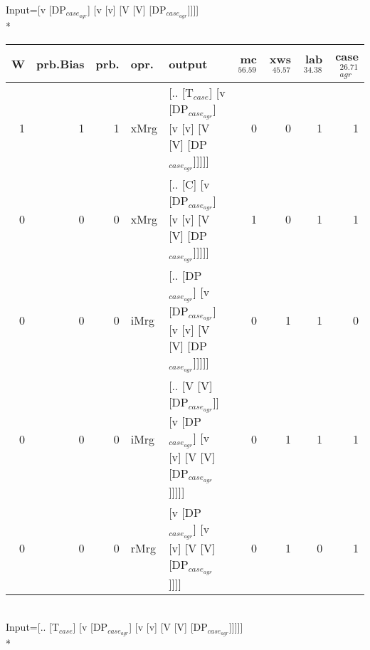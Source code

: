 \begingroup\scriptsize Input=[v [DP$_{case_{agr}}$] [v [v] [V [V] [DP$_{case_{agr}}$]]]]\\*
\begin{tabularx}{\linewidth}{rrrlXrrrr}
\hline
   W &   prb.Bias &   prb. & opr.   & output                                                                     &   mc$^{56.59}$ &   xws$^{45.57}$ &   lab$^{34.38}$ &   case$_{agr}^{26.71}$ \\
\hline
   1 &       1 &   1 & xMrg & [.. [T$_{case}$] [v [DP$_{case_{agr}}$] [v [v] [V [V] [DP$_{case_{agr}}$]]]]]              &            0 &             0 &             1 &                  1 \\
   0 &       0 &   0 & xMrg & [.. [C] [v [DP$_{case_{agr}}$] [v [v] [V [V] [DP$_{case_{agr}}$]]]]]                   &            1 &             0 &             1 &                  1 \\
   0 &       0 &   0 & iMrg & [.. [DP$_{case_{agr}}$] [v [DP$_{case_{agr}}$] [v [v] [V [V] [DP$_{case_{agr}}$]]]]]         &            0 &             1 &             1 &                  0 \\
   0 &       0 &   0 & iMrg & [.. [V [V] [DP$_{case_{agr}}$]] [v [DP$_{case_{agr}}$] [v [v] [V [V] [DP$_{case_{agr}}$]]]]] &            0 &             1 &             1 &                  1 \\
   0 &       0 &   0 & rMrg & [v [DP$_{case_{agr}}$] [v [v] [V [V] [DP$_{case_{agr}}$]]]]                            &            0 &             1 &             0 &                  1 \\
\hline
\end{tabularx}\endgroup\\
\begingroup\scriptsize Input=[.. [T$_{case}$] [v [DP$_{case_{agr}}$] [v [v] [V [V] [DP$_{case_{agr}}$]]]]]\\*
